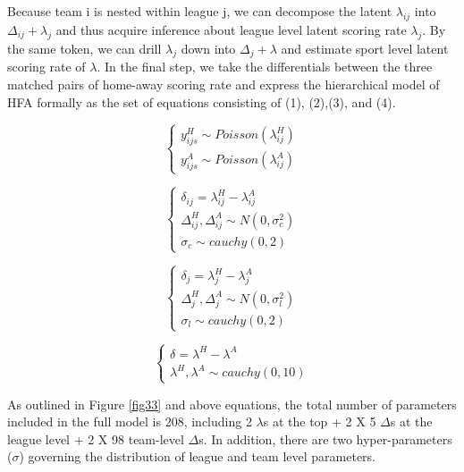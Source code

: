 \documentclass[USenglish]{article}
\begin{document}
Because team i is nested within league j, we can decompose the latent $\lambda_{ij}$ into $\Delta_{ij}+\lambda_j$ and thus acquire inference about league level latent scoring rate $\lambda_j$. By the same token, we can drill $\lambda_j$ down into $\Delta_{j}+\lambda$ and estimate sport level latent scoring rate of $\lambda$. In the final step, we take the differentials between the three matched pairs of home-away scoring rate and express the hierarchical model of HFA formally as the set of equations consisting of (1), (2),(3), and (4). 

\begin{equation}
\begin{cases}
y^H_{ijs} \sim Poisson(\lambda^H_{ij})\\
y^A_{ijs} \sim Poisson(\lambda^A_{ij})
\end{cases}
\end{equation}

\begin{equation}
\begin{cases}
\delta_{ij} = \lambda^H_{ij} - \lambda^A_{ij}\\  
\Delta^H_{ij}, \Delta^A_{ij}  \sim N(0, \sigma^2_c)\\  
\sigma_c \sim cauchy(0,2)
\end{cases}
\end{equation} 

\begin{equation}
\begin{cases}
\delta_{j} = \lambda^H_{j} - \lambda^A_{j}\\  
\Delta^H_{j}, \Delta^A_{j} \sim N(0, \sigma^2_l)\\
\sigma_l \sim cauchy(0,2)
\end{cases}
\end{equation} 

\begin{equation}
\begin{cases}
\delta = \lambda^H - \lambda^A\\
\lambda^H, \lambda^A \sim cauchy(0, 10)
\end{cases}
\end{equation} 

As outlined in Figure \ref{fig33} and above equations, the total number of parameters included in the full model is 208, including 2 $\lambda$s at the top + 2 X 5 $\Delta$s at the league level + 2 X 98 team-level $\Delta$s. In addition, there are two hyper-parameters ($\sigma$) governing the distribution of league and team level parameters.
\end{document}
